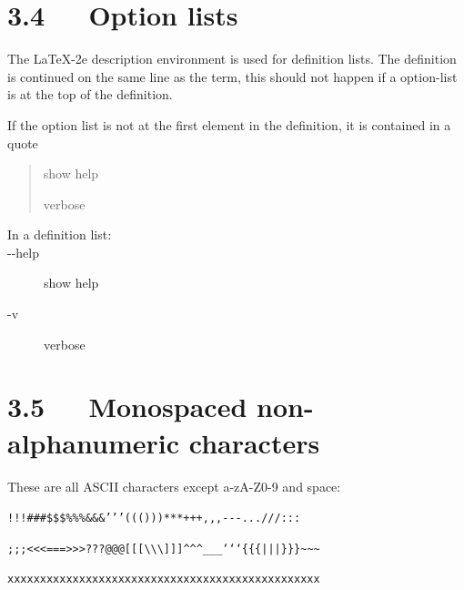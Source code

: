 \documentclass[a4paper]{memoir}
\providecommand*{\DUoptionlistlabel}[1]{\bfseries #1 \hfill}
\newenvironment{DUoptionlist}{%
    \list{}{\setlength{\labelwidth}{\DUoptionlistindent}
            \setlength{\rightmargin}{1cm}
            \setlength{\leftmargin}{\rightmargin}
            \addtolength{\leftmargin}{\labelwidth}
            \addtolength{\leftmargin}{\labelsep}
            \renewcommand{\makelabel}{\DUoptionlistlabel}}
  }
  {\endlist}
\begin{document}


\section{3.4   Option lists%
  \label{option-lists-1}%
}

The LaTeX-2e description environment is used for definition lists.
The definition is continued on the same line as the term, this should
not happen if a option-list is at the top of the definition.

If the option list is not at the first element in the definition, it
is contained in a quote

\begin{quote}
\begin{DUoptionlist}
\item[-{}-help]  show help

\item[-v]  verbose
\end{DUoptionlist}
\end{quote}

\begin{description}
\item[{In a definition list:}] \leavevmode
\begin{DUoptionlist}
\item[-{}-help]  show help

\item[-v]  verbose
\end{DUoptionlist}

\end{description}


\section{3.5   Monospaced non-alphanumeric characters%
  \label{monospaced-non-alphanumeric-characters}%
}

These are all ASCII characters except a-zA-Z0-9 and space:

\texttt{!!!\textquotedbl{}\textquotedbl{}\textquotedbl{}\#\#\#\$\$\$\%\%\%\&\&\&'{}'{}'((()))***+++,{},{},-{}-{}-...///:::}

\texttt{;;;<{}<{}<===>{}>{}>???@@@{[}{[}{[}\textbackslash{}\textbackslash{}\textbackslash{}{]}{]}{]}\textasciicircum{}\textasciicircum{}\textasciicircum{}\_\_\_`{}`{}`\{\{\{|||\}\}\}\textasciitilde{}\textasciitilde{}\textasciitilde{}}

\texttt{xxxxxxxxxxxxxxxxxxxxxxxxxxxxxxxxxxxxxxxxxxxxxxxx}
\end{document}
